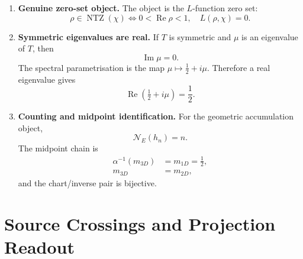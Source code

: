\documentclass[11pt]{article}
\DeclareMathOperator{\Ree}{Re}
\DeclareMathOperator{\Imm}{Im}
\DeclareMathOperator{\NTZ}{NTZ}
\begin{document}
\begin{enumerate}[label=R\arabic*., leftmargin=2cm]
\item \textbf{Genuine zero-set object.}
The object is the $L$-function zero set:
\[
  \rho\in\NTZ(\chi)
  \Longleftrightarrow
  0<\Ree\rho<1,\quad L(\rho,\chi)=0.
\]

\item \textbf{Symmetric eigenvalues are real.}
If $T$ is symmetric and $\mu$ is an eigenvalue of $T$, then
\[
  \Imm\mu=0.
\]
The spectral parametrisation is the map $\mu\mapsto\tfrac12+i\mu$.
Therefore a real eigenvalue gives
\[
  \Ree\!\left(\tfrac12+i\mu\right)=\frac12 .
\]

\item \textbf{Counting and midpoint identification.}
For the geometric accumulation object,
\[
  \mathcal N_{E}(h_n)=n.
\]
The midpoint chain is
\[
\begin{aligned}
  \alpha^{-1}(m_{3D})
    &=m_{1D}=\frac12,\\
  m_{3D}
    &=m_{2D},
\end{aligned}
\]
and the chart/inverse pair is bijective.
\end{enumerate}

\section{Source Crossings and Projection Readout}
\end{document}
